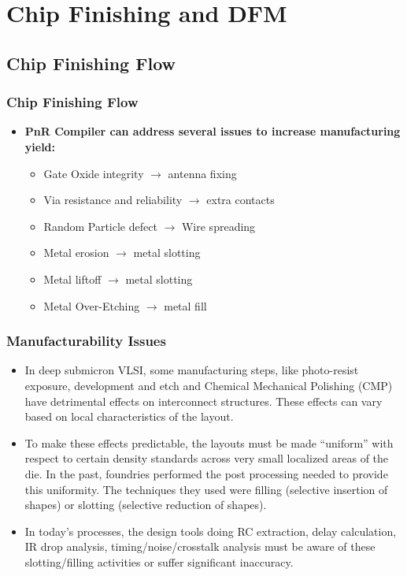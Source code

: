 \documentclass[compress]{beamer}
\begin{document}
\section[DFM]{Chip Finishing and DFM }
\subsection[Flow]{Chip Finishing Flow}
\begin{frame}
	\frametitle{Chip Finishing Flow}
	\begin{itemize}
		\item \textbf{PnR Compiler can address several issues to increase manufacturing yield:}
		\begin{itemize}
			\item Gate Oxide integrity $\rightarrow$ antenna fixing
			\item Via resistance and reliability $\rightarrow$ extra contacts
			\item Random Particle defect $\rightarrow$ Wire spreading
			\item Metal erosion $\rightarrow$ metal slotting
			\item Metal liftoff $\rightarrow$ metal slotting
			\item Metal Over-Etching $\rightarrow$ metal fill
		\end{itemize}
	\end{itemize}
\end{frame}

\begin{frame}
	\frametitle{Manufacturability Issues}
	\begin{itemize}
		\item In deep submicron VLSI, some manufacturing steps, like photo-resist exposure, development and
		etch and Chemical Mechanical Polishing (CMP) have detrimental effects on interconnect
		structures. These effects can vary based on local characteristics of the layout.
		\item To make these effects predictable, the layouts must be made “uniform” with respect to certain
		density standards across very small localized areas of the die. In the past, foundries performed the
		post processing needed to provide this uniformity. The techniques they used were filling (selective
		insertion of shapes) or slotting (selective reduction of shapes).
		\item In today’s processes, the design tools doing RC extraction, delay calculation, IR drop analysis,
		timing/noise/crosstalk analysis must be aware of these slotting/filling activities or suffer
		significant inaccuracy.
		
	\end{itemize}
\end{frame}
\end{document}
